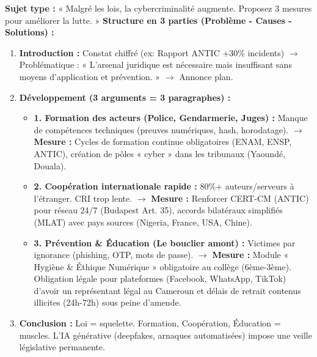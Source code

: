 \documentclass[11pt]{article}
\begin{document}
\begin{methode}
    \textbf{Sujet type :} « Malgré les lois, la cybercriminalité augmente. Proposez 3 mesures pour améliorer la lutte. »
    \textbf{Structure en 3 parties (Problème - Causes - Solutions) :}
    \begin{enumerate}
        \item \textbf{Introduction :} Constat chiffré (ex: Rapport ANTIC +30\% incidents) $\rightarrow$ Problématique : « L'arsenal juridique est nécessaire mais insuffisant sans moyens d'application et prévention. » $\rightarrow$ Annonce plan.
        \item \textbf{Développement (3 arguments = 3 paragraphes) :}
              \begin{itemize}
                  \item \textbf{1. Formation des acteurs (Police, Gendarmerie, Juges) :} Manque de compétences techniques (preuves numériques, hash, horodatage). $\rightarrow$ \textbf{Mesure :} Cycles de formation continue obligatoires (ENAM, ENSP, ANTIC), création de pôles « cyber » dans les tribunaux (Yaoundé, Douala).
                  \item \textbf{2. Coopération internationale rapide :} 80\%+ auteurs/serveurs à l'étranger. CRI trop lente. $\rightarrow$ \textbf{Mesure :} Renforcer CERT-CM (ANTIC) pour réseau 24/7 (Budapest Art. 35), accords bilatéraux simplifiés (MLAT) avec pays sources (Nigeria, France, USA, Chine).
                  \item \textbf{3. Prévention \& Éducation (Le bouclier amont) :} Victimes par ignorance (phishing, OTP, mots de passe). $\rightarrow$ \textbf{Mesure :} Module « Hygiène \& Éthique Numérique » obligatoire au collège (6ème-3ème). Obligation légale pour plateformes (Facebook, WhatsApp, TikTok) d'avoir un représentant légal au Cameroun et délais de retrait contenus illicites (24h-72h) sous peine d'amende.
              \end{itemize}
        \item \textbf{Conclusion :} Loi = squelette. Formation, Coopération, Éducation = muscles. L'IA générative (deepfakes, arnaques automatisées) impose une veille législative permanente.
    \end{enumerate}
\end{methode}
\end{document}
